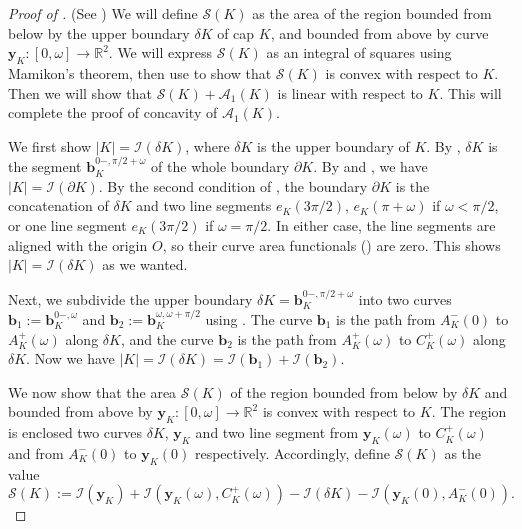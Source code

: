 \begin{proof}[Proof of ]
(See ) We will define \(\mathcal{S}(K)\) as the area of the region bounded from below by the upper boundary \(\delta K\) of cap \(K\), and bounded from above by curve \(\mathbf{y}_K : [0, \omega] \to \mathbb{R}^2\). We will express \(\mathcal{S}(K)\) as an integral of squares using Mamikon’s theorem, then use  to show that \(\mathcal{S}(K)\) is convex with respect to \(K\). Then we will show that \(\mathcal{S}(K) + \mathcal{A}_1(K)\) is linear with respect to \(K\). This will complete the proof of concavity of \(\mathcal{A}_1(K)\).

We first show \(|K| = \mathcal{I}(\delta K)\), where \(\delta K\) is the upper boundary of \(K\). By , \(\delta K\) is the segment \(\mathbf{b}_K^{0-, \pi/2 + \omega}\) of the whole boundary \(\partial K\). By  and , we have \(|K| = \mathcal{I}(\partial K)\). By the second condition of , the boundary \(\partial K\) is the concatenation of \(\delta K\) and two line segments \(e_K(3\pi/2)\), \(e_K(\pi + \omega)\) if \(\omega < \pi/2\), or one line segment \(e_K(3\pi/2)\) if \(\omega = \pi/2\). In either case, the line segments are aligned with the origin \(O\), so their curve area functionals () are zero. This shows \(|K| = \mathcal{I}(\delta K)\) as we wanted.

Next, we subdivide the upper boundary \(\delta K = \mathbf{b}_K^{0-, \pi/2+\omega}\) into two curves \(\mathbf{b}_1 := \mathbf{b}_K^{0-, \omega}\) and \(\mathbf{b}_2 := \mathbf{b}_K^{\omega, \omega + \pi/2}\) using . The curve \(\mathbf{b}_1\) is the path from \(A_K^-(0)\) to \(A_K^+(\omega)\) along \(\delta K\), and the curve \(\mathbf{b}_2\) is the path from \(A_K^+(\omega)\) to \(C_K^+(\omega)\) along \(\delta K\). Now we have \(|K| = \mathcal{I}(\delta K) = \mathcal{I}(\mathbf{b}_1) + \mathcal{I}(\mathbf{b}_2)\).

We now show that the area \(\mathcal{S}(K)\) of the region bounded from below by \(\delta K\) and bounded from above by \(\mathbf{y}_K : [0, \omega] \to \mathbb{R}^2\) is convex with respect to \(K\). The region is enclosed two curves \(\delta K\), \(\mathbf{y}_K\) and two line segment from \(\mathbf{y}_K(\omega)\) to \(C_K^+(\omega)\) and from \(A_K^-(0)\) to \(\mathbf{y}_K(0)\) respectively. Accordingly, define \(\mathcal{S}(K)\) as the value
\[
\mathcal{S}(K) := \mathcal{I}(\mathbf{y}_K) + \mathcal{I}(\mathbf{y}_K(\omega), C_K^+(\omega)) - \mathcal{I}(\delta K) - \mathcal{I}(\mathbf{y}_K(0), A_K^-(0)).
\]


\end{proof}
